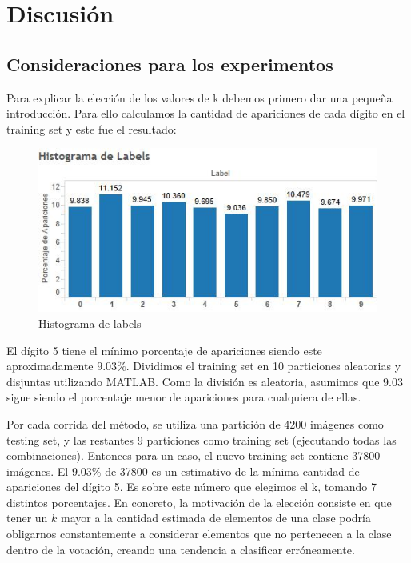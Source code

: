 \documentclass{article}
\begin{document}
\pagebreak

\section*{Discusión}{}

\subsection*{Consideraciones para los experimentos}

Para explicar la elección de los valores de k debemos primero dar una pequeña introducción.  Para ello calculamos la cantidad de apariciones de cada dígito en el training set y este fue el resultado:

\begin{figure}[h]
\centering
\includegraphics[scale=0.80]{histo.jpg}
\caption{Histograma de labels}
\end{figure}

El dígito 5 tiene el mínimo porcentaje de apariciones siendo este aproximadamente $9.03\%$.  Dividimos el training set en 10 particiones aleatorias y disjuntas utilizando MATLAB. Como la división es aleatoria, asumimos que $9.03$ sigue siendo el porcentaje menor de apariciones para cualquiera de ellas. 

Por cada corrida del método, se utiliza una partición de 4200 imágenes como testing set, y las restantes 9 particiones como training set (ejecutando todas las combinaciones).  Entonces para un caso, el nuevo training set contiene 37800 imágenes. El $9.03\%$ de 37800 es un estimativo de la mínima cantidad de apariciones del dígito 5. Es sobre este número que elegimos el k, tomando 7 distintos porcentajes. En concreto, la motivación de la elección consiste en que tener un $k$ mayor a la cantidad estimada de elementos de una clase podría obligarnos constantemente a considerar elementos que no pertenecen a la clase dentro de la votación, creando una tendencia a clasificar erróneamente.
\end{document}
